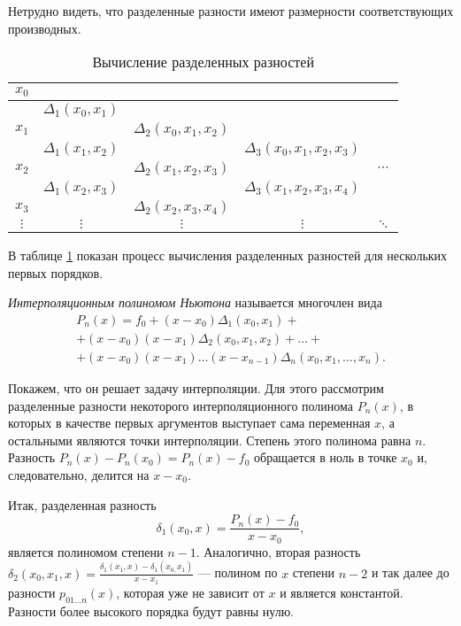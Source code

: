 Нетрудно видеть, что разделенные разности имеют размерности соответствующих
производных.
\begin{table}
\noindent \begin{centering}
\begin{tabular}{|c|c|c|c|c|}
\hline 
$x_{0}$ &  &  &  & \tabularnewline
\hline 
 & $\Delta_{1}(x_{0},x_{1})$ &  &  & \tabularnewline
\hline 
$x_{1}$ &  & $\Delta_{2}(x_{0},x_{1},x_{2})$ &  & \tabularnewline
\hline 
 & $\Delta_{1}(x_{1},x_{2})$ &  & $\Delta_{3}(x_{0},x_{1},x_{2},x_{3})$ & \tabularnewline
\hline 
$x_{2}$ &  & $\Delta_{2}(x_{1},x_{2},x_{3})$ &  & $\cdots$\tabularnewline
\hline 
 & $\Delta_{1}(x_{2},x_{3})$ &  & $\Delta_{3}(x_{1},x_{2},x_{3},x_{4})$ & \tabularnewline
\hline 
$x_{3}$ &  & $\Delta_{2}(x_{2},x_{3},x_{4})$ &  & \tabularnewline
\hline 
$\vdots$ & $\vdots$ & $\vdots$ & $\vdots$ & $\ddots$\tabularnewline
\hline 
\end{tabular}
\par\end{centering}

\caption{Вычисление разделенных разностей}
\label{tab:divdiff}
\end{table}
 В таблице \ref{tab:divdiff} показан процесс вычисления разделенных
разностей для нескольких первых порядков.

\emph{Интерполяционным полиномом Ньютона}
называется многочлен вида
\begin{multline*}
P_{n}(x)=f_{0}+(x-x_{0})\Delta_{1}(x_{0},x_{1})+\\
+(x-x_{0})(x-x_{1})\Delta_{2}(x_{0},x_{1},x_{2})+\dots+\\
+(x-x_{0})(x-x_{1})\dots(x-x_{n-1})\Delta_{n}(x_{0},x_{1},\dots,x_{n}).
\end{multline*}


Покажем, что он решает задачу интерполяции. Для этого рассмотрим разделенные
разности некоторого интерполяционного полинома $P_{n}(x)$, в которых
в качестве первых аргументов выступает сама переменная $x$, а остальными
являются точки интерполяции. Степень этого полинома равна $n$. Разность
$P_{n}(x)-P_{n}(x_{0})=P_{n}(x)-f_{0}$ обращается в ноль в точке
$x_{0}$ и, следовательно, делится на $x-x_{0}$.

Итак, разделенная разность
\[
\delta_{1}(x_{0},x)=\frac{P_{n}(x)-f_{0}}{x-x_{0}},
\]
является полиномом степени $n-1$. Аналогично, вторая разность $\delta_{2}(x_{0},x_{1},x)=\frac{\delta_{1}(x_{1},x)-\delta_{1}(x_{0,}x_{1})}{x-x_{1}}$
--- полином по $x$ степени $n-2$ и так далее до разности $p_{01\dots n}(x)$,
которая уже не зависит от $x$ и является константой. Разности более
высокого порядка будут равны нулю.

